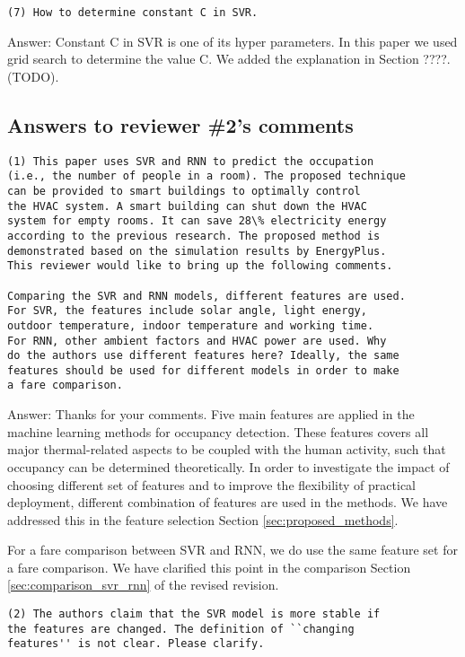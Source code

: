 \begin{verbatim}
(7) How to determine constant C in SVR.
\end{verbatim}
Answer: Constant C in SVR is one of its hyper parameters. In this paper we used
grid search to determine the value C. We added the explanation in
Section ????. (TODO).

\subsection{Answers to reviewer \#2's comments}
\begin{verbatim}
(1) This paper uses SVR and RNN to predict the occupation
(i.e., the number of people in a room). The proposed technique
can be provided to smart buildings to optimally control
the HVAC system. A smart building can shut down the HVAC
system for empty rooms. It can save 28\% electricity energy
according to the previous research. The proposed method is
demonstrated based on the simulation results by EnergyPlus.
This reviewer would like to bring up the following comments.

Comparing the SVR and RNN models, different features are used.
For SVR, the features include solar angle, light energy,
outdoor temperature, indoor temperature and working time.
For RNN, other ambient factors and HVAC power are used. Why
do the authors use different features here? Ideally, the same
features should be used for different models in order to make
a fare comparison.
\end{verbatim}

Answer: Thanks for your comments. Five main features are applied in
the machine learning methods for occupancy detection.  These features
covers all major thermal-related aspects to be coupled with the human
activity, such that occupancy can be determined theoretically. In
order to investigate the impact of choosing different set of features
and to improve the flexibility of practical deployment, different
combination of features are used in the methods. We have addressed
this in the feature selection Section \ref{sec:proposed_methods}.

For a fare comparison between SVR and RNN, we do use the same feature
set for a fare comparison. We have clarified this point in the
comparison Section \ref{sec:comparison_svr_rnn} of the revised
revision.

\begin{verbatim}
(2) The authors claim that the SVR model is more stable if
the features are changed. The definition of ``changing
features'' is not clear. Please clarify.
\end{verbatim}


